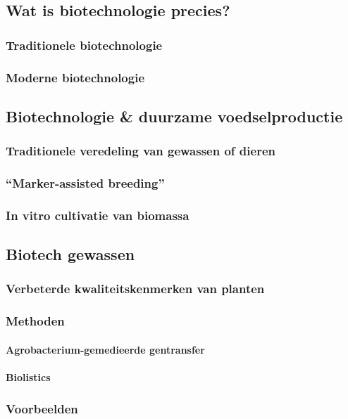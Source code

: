 \documentclass[a4paper,kul]{kulakarticle} %
\begin{document}
\subsection{Wat is biotechnologie precies?}
\subsubsection{Traditionele biotechnologie}
\subsubsection{Moderne biotechnologie}
\subsection{Biotechnologie \& duurzame voedselproductie}
\subsubsection{Traditionele veredeling van gewassen of dieren}
\subsubsection{“Marker-assisted breeding”}
\subsubsection{In vitro cultivatie van biomassa}
\subsection{Biotech gewassen}
\subsubsection{Verbeterde kwaliteitskenmerken van planten}
\subsubsection{Methoden}
\paragraph{Agrobacterium-gemedieerde gentransfer}
\paragraph{Biolistics}
\subsubsection{Voorbeelden}
\end{document}
